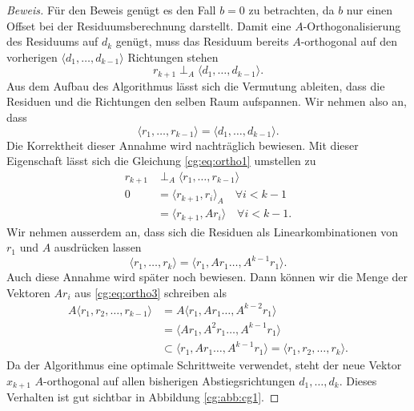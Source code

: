\begin{proof}[Beweis]
Für den Beweis genügt es den Fall $b=0$ zu betrachten, da $b$ nur einen Offset bei der Residuumsberechnung darstellt.
Damit eine $A$-Orthogonalisierung des Residuums auf $d_k$ genügt, muss das Residuum bereits $A$-orthogonal auf den vorherigen $\langle d_1, \dots ,d_{k-1} \rangle$ Richtungen stehen
\begin{equation} \label{cg:eq:ortho1}
	r_{k+1} \perp_A \langle d_1, \dots ,d_{k-1} \rangle.
\end{equation} 
Aus dem Aufbau des Algorithmus lässt sich die Vermutung ableiten, dass die Residuen und die Richtungen den selben Raum aufspannen.
Wir nehmen also an, dass
\begin{equation}\label{cg:eq:ortho2}
\langle r_1, \dots ,r_{k-1} \rangle 
= 
\langle d_1, \dots ,d_{k-1} \rangle.
\end{equation}
Die Korrektheit dieser Annahme wird nachträglich bewiesen. 
Mit dieser Eigenschaft lässt sich die Gleichung \eqref{cg:eq:ortho1} umstellen zu
\begin{align}\label{cg:eq:ortho3}
	r_{k+1} 	&\perp_A \langle r_1, \dots ,r_{k-1} \rangle \nonumber \\
	0 			&= \langle r_{k+1}, r_i \rangle_A \quad \forall i < k-1 \nonumber\\
				&= \langle r_{k+1}, Ar_i \rangle \quad \forall i < k-1.
\end{align} 
Wir nehmen ausserdem an, dass sich die Residuen als Linearkombinationen von $r_1$ und $A$ ausdrücken lassen
\begin{equation}
	\langle r_1, \dots ,r_k \rangle = \langle r_1, Ar_1 \dots ,A^{k-1}r_1 \rangle.
\end{equation}
Auch diese Annahme wird später noch bewiesen.
Dann können wir die Menge der Vektoren $Ar_i$ aus \eqref{cg:eq:ortho3} schreiben als
\begin{align}\label{cg:eq:ortho4}
	A \langle r_1, r_2, \dots , r_{k-1} \rangle &= A \langle r_1, Ar_1 \dots ,A^{k-2}r_1 \rangle \nonumber\\
												&= \langle Ar_1, A^2r_1 \dots ,A^{k-1}r_1 \rangle \nonumber\\
												&\subset \langle r_1, Ar_1 \dots ,A^{k-1}r_1 \rangle = \langle r_1, r_2, \dots , r_k \rangle.
\end{align} 
Da der Algorithmus eine optimale Schrittweite verwendet, steht der neue Vektor $x_{k+1}$ $A$-orthogonal auf allen bisherigen Abstiegsrichtungen $d_1, \dots, d_k$.
Dieses Verhalten ist gut sichtbar in Abbildung \ref{cg:abb:cg1}.

\end{proof}
